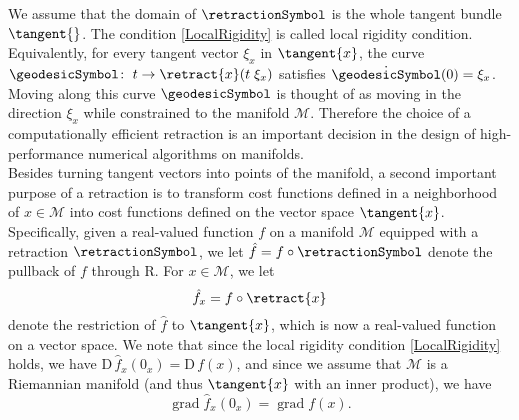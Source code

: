 We assume that the domain of $\retractionSymbol$ is the whole tangent bundle $\tangent{}$. The condition \cref{LocalRigidity} is called local rigidity condition. Equivalently, for every tangent vector $\xi_x$ in $\tangent{x}$, the curve $\geodesicSymbol \colon \; t \to \retract{x}(t \; \xi_x)$ satisfies $\dot{\geodesicSymbol}(0) = \xi_x$. Moving along this curve $\geodesicSymbol$ is thought of as moving in the direction $\xi_x$ while constrained to the manifold $\mathcal{M}$. Therefore the choice of a computationally efficient retraction is an important decision in the design of high-performance numerical algorithms on manifolds. \\
Besides turning tangent vectors into points of the manifold, a second important purpose of a retraction is to transform cost functions defined in a neighborhood of $x \in \mathcal{M}$ into cost functions defined on the vector space $\tangent{x}$. Specifically, given a real-valued function $f$ on a manifold $\mathcal{M}$ equipped with a retraction $\retractionSymbol$, we let $\hat{f} = f \circ \retractionSymbol$ denote the pullback of $f$ through R. For $x \in \mathcal{M}$, we let
\begin{equation}\label{pullback}
    \hat{f}_x = f \circ \retract{x}
\end{equation}
denote the restriction of $\hat{f}$ to $\tangent{x}$, which is now a real-valued function on a vector space. We note that since the local rigidity condition \cref{LocalRigidity} holds, we have $\mathrm{D} \, \hat{f}_x (0_x) = \mathrm{D} \, f(x)$, and since we assume that $\mathcal{M}$ is a Riemannian manifold (and thus $\tangent{x}$ with an inner product), we have 
\begin{equation*}
    \operatorname{grad} \hat{f}_x (0_x) = \operatorname{grad} f(x).
\end{equation*}
\cite[p.~54-56]{AbsilMahonySepulchre:2008}
